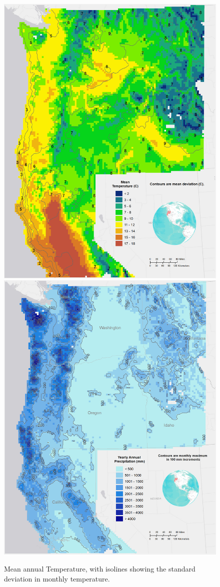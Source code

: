 \documentclass[preprint,12pt]{elsarticle}
\begin{document}
\begin{figure}[hp]
  \centering  
  \includegraphics[width=1\linewidth]{dailytemp}  
  \includegraphics[width=0.45\linewidth]{precip}  
\caption{Mean annual Temperature, with isolines showing the standard deviation in monthly temperature.}
  \label{fig:temp}
\end{figure}
\end{document}
